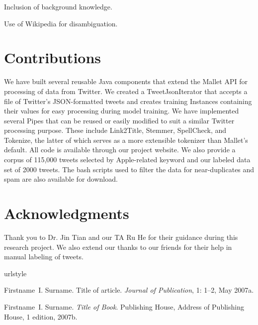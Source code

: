 \documentclass[letterpaper]{article}
\begin{document}
Inclusion of background knowledge.

Use of Wikipedia for disambiguation.

\section{Contributions}
We have built several reusable Java components that extend the Mallet API for processing of data from Twitter. We created a TweetJsonIterator that accepts a file of Twitter's JSON-formatted tweets and creates training Instances containing their values for easy processing during model training. We have implemented several Pipes that can be reused or easily modified to suit a similar Twitter processing purpose. These include Link2Title, Stemmer, SpellCheck, and Tokenize, the latter of which serves as a more extensible tokenizer than Mallet's default. All code is available through our project website. We also provide a corpus of 115,000 tweets selected by Apple-related keyword and our labeled data set of 2000 tweets. The bash scripts used to filter the data for near-duplicates and spam are also available for download.

\section{ Acknowledgments}
Thank you to Dr. Jin Tian and our TA Ru He for their guidance during this research project. We also extend our thanks to our friends for their help in manual labeling of tweets.




\begin{thebibliography}{2}
\providecommand{\natexlab}[1]{#1}
\providecommand{\url}[1]{\texttt{#1}}
\expandafter\ifx\csname urlstyle\endcsname\relax
\providecommand{\doi}[1]{doi: #1}\else
\providecommand{\doi}{doi: \begingroup \urlstyle{rm}\Url}\fi

\bibitem[{Surname}(2007{\natexlab{a}})]{article_label}
Firstname~I. {Surname}.
\newblock Title of article.
\newblock \emph{Journal of Publication}, 1: 1--2, May
2007{\natexlab{a}}.

\bibitem[{Surname2}(2007{\natexlab{b}})]{book_label}
Firstname~I. {Surname}.
\newblock \emph{Title of Book}.
\newblock Publishing House, Address of Publishing House, 1 edition,
2007{\natexlab{b}}.

\end{thebibliography}

\end{document}
